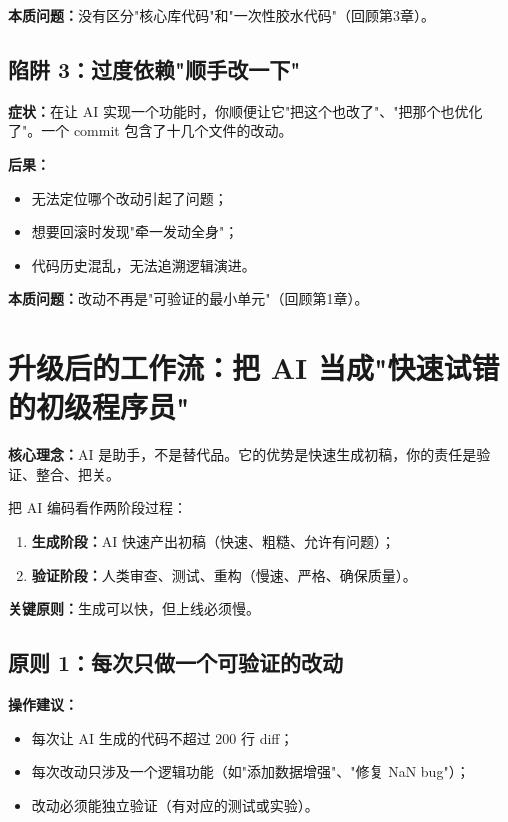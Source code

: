 \textbf{本质问题：}没有区分"核心库代码"和"一次性胶水代码"（回顾第3章）。

\subsection{陷阱 3：过度依赖"顺手改一下"}

\textbf{症状：}在让 AI 实现一个功能时，你顺便让它"把这个也改了"、"把那个也优化了"。一个 commit 包含了十几个文件的改动。

\textbf{后果：}
\begin{itemize}
  \item 无法定位哪个改动引起了问题；
  \item 想要回滚时发现"牵一发动全身"；
  \item 代码历史混乱，无法追溯逻辑演进。
\end{itemize}

\textbf{本质问题：}改动不再是"可验证的最小单元"（回顾第1章）。

\section{升级后的工作流：把 AI 当成"快速试错的初级程序员"}

\textbf{核心理念：}AI 是助手，不是替代品。它的优势是快速生成初稿，你的责任是验证、整合、把关。

把 AI 编码看作两阶段过程：
\begin{enumerate}
  \item \textbf{生成阶段：}AI 快速产出初稿（快速、粗糙、允许有问题）；
  \item \textbf{验证阶段：}人类审查、测试、重构（慢速、严格、确保质量）。
\end{enumerate}

\textbf{关键原则：}生成可以快，但上线必须慢。

\subsection{原则 1：每次只做一个可验证的改动}

\textbf{操作建议：}
\begin{itemize}
  \item 每次让 AI 生成的代码不超过 200 行 diff；
  \item 每次改动只涉及一个逻辑功能（如"添加数据增强"、"修复 NaN bug"）；
  \item 改动必须能独立验证（有对应的测试或实验）。
\end{itemize}

